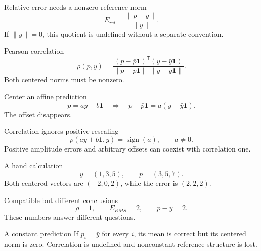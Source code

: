\documentclass[aspectratio=169,11pt]{beamer}
\newcommand{\notestarget}{notes.pdf}\newcommand{\noteslabel}{Notes}
\begin{document}
\begin{frame}[t,fragile,label=slide-relative-error-needs-a-nonzero-reference-norm]{Relative error needs a nonzero reference norm}
\[E_{rel}=\frac{\|p-y\|}{\|y\|}.\]\pause{} If $\|y\|=0$, this quotient is undefined without a separate convention.
\end{frame}
\renewcommand{\notestarget}{notes.pdf\#note-affine-invariance-of-pearson-correlation}
\begin{frame}[t,fragile,label=slide-pearson-correlation]{Pearson correlation}
\[\rho(p,y)=\frac{(p-\bar p\boldsymbol1)^{\mathsf T}(y-\bar y\boldsymbol1)}{\|p-\bar p\boldsymbol1\|\,\|y-\bar y\boldsymbol1\|}.\]\pause{} Both centered norms must be nonzero.
\end{frame}
\renewcommand{\notestarget}{notes.pdf\#note-affine-invariance-of-pearson-correlation}
\begin{frame}[t,fragile,label=slide-center-an-affine-prediction]{Center an affine prediction}
\[p=ay+b\boldsymbol1\quad\Longrightarrow\quad p-\bar p\boldsymbol1=a(y-\bar y\boldsymbol1).\]\pause{} The offset disappears.
\end{frame}
\renewcommand{\notestarget}{notes.pdf\#note-affine-invariance-of-pearson-correlation}
\begin{frame}[t,fragile,label=slide-correlation-ignores-positive-rescaling]{Correlation ignores positive rescaling}
\[\rho(ay+b\boldsymbol1,y)=\operatorname{sign}(a),\qquad a\ne0.\]\pause{} Positive amplitude errors and arbitrary offsets can coexist with correlation one.
\end{frame}
\renewcommand{\notestarget}{notes.pdf\#note-affine-invariance-of-pearson-correlation}
\begin{frame}[t,fragile,label=slide-a-hand-calculation]{A hand calculation}
\[y=(1,3,5),\qquad p=(3,5,7).\]\pause{} Both centered vectors are $(-2,0,2)$, while the error is $(2,2,2)$.
\end{frame}
\renewcommand{\notestarget}{notes.pdf\#note-affine-invariance-of-pearson-correlation}
\begin{frame}[t,fragile,label=slide-compatible-but-different-conclusions]{Compatible but different conclusions}
\[\rho=1,\qquad E_{RMS}=2,\qquad\bar p-\bar y=2.\]\pause{} These numbers answer different questions.
\end{frame}
\renewcommand{\notestarget}{notes.pdf\#note-affine-invariance-of-pearson-correlation}
\begin{frame}[t,fragile,label=slide-a-constant-prediction]{A constant prediction}
If $p_i=\bar y$ for every $i$, its mean is correct but its centered norm is zero.\pause{} Correlation is undefined and nonconstant reference structure is lost.
\end{frame}
\end{document}
